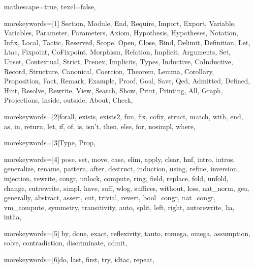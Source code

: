 
 {

mathescape=true,
texcl=false,


morekeywords=[1]{
Section, Module, End, Require, Import, Export,
Variable, Variables, Parameter, Parameters, Axiom, Hypothesis, Hypotheses,
Notation, Infix, Local, Tactic, Reserved, Scope, Open, Close, Bind, Delimit,
Definition, Let, Ltac, Fixpoint, CoFixpoint, Morphism, Relation,
Implicit, Arguments, Set, Unset, Contextual, Strict, Prenex,
Implicits, Types,
Inductive, CoInductive, Record, Structure, Canonical, Coercion,
Theorem, Lemma, Corollary, Proposition, Fact, Remark, Example,
Proof, Goal, Save, Qed, Admitted, Defined, Hint, Resolve, Rewrite, View,
Search, Show, Print, Printing, All, Graph, Projections,
inside, outside,
About, Check},


morekeywords=[2]{forall, exists, exists2, fun, fix, cofix, struct,
      match, with, end, as, in, return, let, if, of, is, isn't, then, else,
      for, nosimpl, where},

morekeywords=[3]{Type, Prop},

morekeywords=[4]{
         pose, set, move, case, elim, apply, clear,
            hnf, intro, intros, generalize, rename, pattern, after,
            destruct, induction, using, refine, inversion, injection,
         rewrite, congr, unlock, compute, ring, field,
            replace, fold, unfold, change, cutrewrite, simpl,
         have, suff, wlog, suffices, without, loss, nat_norm,
         gen, generally, abstract,
            assert, cut, trivial, revert, bool_congr, nat_congr, vm_compute,
         symmetry, transitivity, auto, split, left, right,
         autorewrite, lia, intlia},

morekeywords=[5]{
         by, done, exact, reflexivity, tauto, romega, omega,
         assumption, solve, contradiction, discriminate, admit},


morekeywords=[6]{do, last, first, try, idtac, repeat},

}
